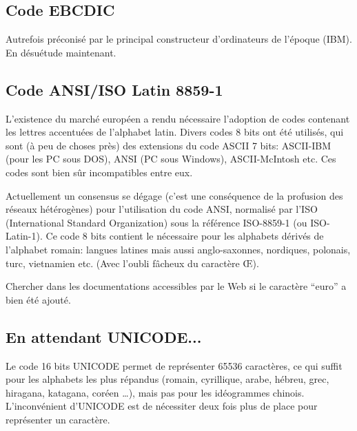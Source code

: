 \subsection{Code EBCDIC}

Autrefois pr\'econis\'e par le principal constructeur d'ordinateurs de 
l'\'epoque (IBM). En d\'esu\'etude maintenant.

\subsection{Code ANSI/ISO Latin 8859-1}

L'existence du march\'e europ\'een a rendu n\'ecessaire l'adoption de codes
contenant les lettres accentu\'ees de l'alphabet latin. Divers codes 8 bits
ont  \'et\'e utilis\'es, qui sont (\`a peu de choses pr\`es) des extensions du 
code ASCII 7 bits: ASCII-IBM (pour les PC sous DOS), ANSI (PC sous Windows),
ASCII-McIntosh etc. Ces codes sont bien s\^ur incompatibles entre eux.

Actuellement un consensus se d\'egage (c'est une cons\'equence de la
profusion des r\'eseaux h\'et\'erog\`enes) pour l'utilisation du code
ANSI, normalis\'e par l'ISO (International Standard Organization) sous
la r\'ef\'erence ISO-8859-1 (ou ISO-Latin-1).  Ce code 8 bits contient
le n\'ecessaire pour les alphabets d\'eriv\'es de l'alphabet romain:
langues latines mais aussi anglo-saxonnes, nordiques, polonais, turc,
vietnamien etc.  (Avec l'oubli f\^acheux du caract\`ere \OE).

\begin{exercice}{}Chercher dans les documentations accessibles par le Web
si le caractère ``euro'' a bien été ajouté. 
\end{exercice}

\subsection{En attendant UNICODE...}

Le code 16 bits UNICODE permet de repr\'esenter 65536 caract\`eres, 
ce qui suffit pour les alphabets les plus r\'epandus (romain, cyrillique,
arabe, h\'ebreu, grec, hiragana, katagana, cor\'een \ldots), mais pas pour
les id\'eogrammes chinois.  L'inconv\'enient d'UNICODE est de n\'ecessiter
deux fois plus de place pour repr\'esenter un caract\`ere.
